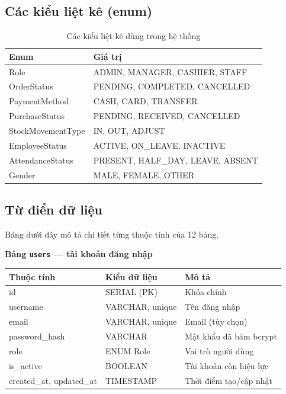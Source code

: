 \documentclass[12pt,a4paper]{report}
\begin{document}
\subsection{Các kiểu liệt kê (enum)}
\begin{table}[H]\centering\small
\begin{tabularx}{\textwidth}{|L{3.5cm}|X|}
\hline
\textbf{Enum} & \textbf{Giá trị} \\ \hline
Role & ADMIN, MANAGER, CASHIER, STAFF \\ \hline
OrderStatus & PENDING, COMPLETED, CANCELLED \\ \hline
PaymentMethod & CASH, CARD, TRANSFER \\ \hline
PurchaseStatus & PENDING, RECEIVED, CANCELLED \\ \hline
StockMovementType & IN, OUT, ADJUST \\ \hline
EmployeeStatus & ACTIVE, ON\_LEAVE, INACTIVE \\ \hline
AttendanceStatus & PRESENT, HALF\_DAY, LEAVE, ABSENT \\ \hline
Gender & MALE, FEMALE, OTHER \\ \hline
\end{tabularx}
\caption{Các kiểu liệt kê dùng trong hệ thống}
\end{table}

\subsection{Từ điển dữ liệu}
Bảng dưới đây mô tả chi tiết từng thuộc tính của 12 bảng.

\newcommand{\dicthead}{\hline \textbf{Thuộc tính} & \textbf{Kiểu dữ liệu} & \textbf{Mô tả} \\ \hline \endhead}

\textbf{Bảng \texttt{users} --- tài khoản đăng nhập}
\begin{longtable}{|L{3.3cm}|L{3.8cm}|L{7.7cm}|} \dicthead
id & SERIAL (PK) & Khóa chính \\ \hline
username & VARCHAR, unique & Tên đăng nhập \\ \hline
email & VARCHAR, unique & Email (tùy chọn) \\ \hline
password\_hash & VARCHAR & Mật khẩu đã băm bcrypt \\ \hline
role & ENUM Role & Vai trò người dùng \\ \hline
is\_active & BOOLEAN & Tài khoản còn hiệu lực \\ \hline
created\_at, updated\_at & TIMESTAMP & Thời điểm tạo/cập nhật \\ \hline
\end{longtable}
\end{document}
